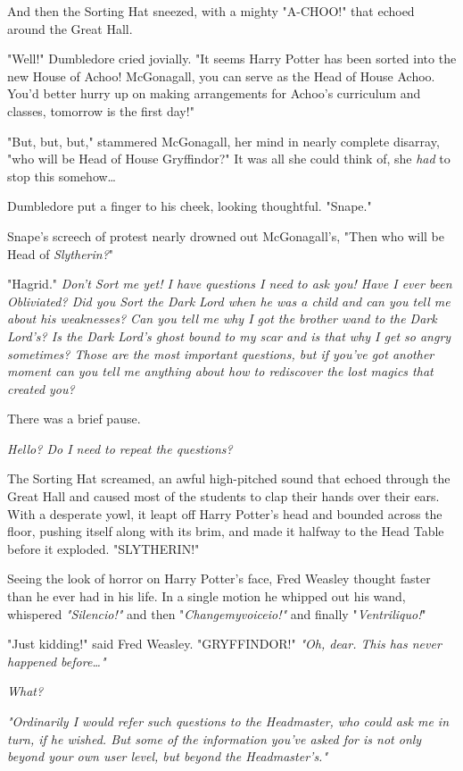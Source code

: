 And then the Sorting Hat sneezed, with a mighty "A-CHOO!" that echoed around 
the Great Hall.

"Well!" Dumbledore cried jovially. "It seems Harry Potter has been sorted into 
the new House of Achoo! McGonagall, you can serve as the Head of House Achoo. 
You'd better hurry up on making arrangements for Achoo's curriculum and 
classes, tomorrow is the first day!"

"But, but, but," stammered McGonagall, her mind in nearly complete disarray, 
"who will be Head of House Gryffindor?" It was all she could think of, she 
\emph{had} to stop this somehow{\ldots}

Dumbledore put a finger to his cheek, looking thoughtful. "Snape."

Snape's screech of protest nearly drowned out McGonagall's, "Then who will be 
Head of \emph{Slytherin?}"

"Hagrid."
\sbreak
\emph{Don't Sort me yet! I have questions I need to ask you! Have I ever been 
Obliviated? Did you Sort the Dark Lord when he was a child and can you tell me 
about his weaknesses? Can you tell me why I got the brother wand to the Dark 
Lord's? Is the Dark Lord's ghost bound to my scar and is that why I get so 
angry sometimes? Those are the most important questions, but if you've got 
another moment can you tell me anything about how to rediscover the lost magics 
that created you?}

There was a brief pause.

\emph{Hello? Do I need to repeat the questions?}

The Sorting Hat screamed, an awful high-pitched sound that echoed through the 
Great Hall and caused most of the students to clap their hands over their ears. 
With a desperate yowl, it leapt off Harry Potter's head and bounded across the 
floor, pushing itself along with its brim, and made it halfway to the Head 
Table before it exploded.
\sbreak
"SLYTHERIN!"

Seeing the look of horror on Harry Potter's face, Fred Weasley thought faster 
than he ever had in his life. In a single motion he whipped out his wand, 
whispered \emph{"Silencio!"} and then "\emph{Changemyvoiceio!"} and finally 
"\emph{Ventriliquo!}"

"Just kidding!" said Fred Weasley. "GRYFFINDOR!"
\sbreak
\emph{"Oh, dear. This has never happened before{\ldots}"}

\emph{What?}

\emph{"Ordinarily I would refer such questions to the Headmaster, who could ask 
me in turn, if he wished. But some of the information you've asked for is not 
only beyond your own user level, but beyond the Headmaster's."}

